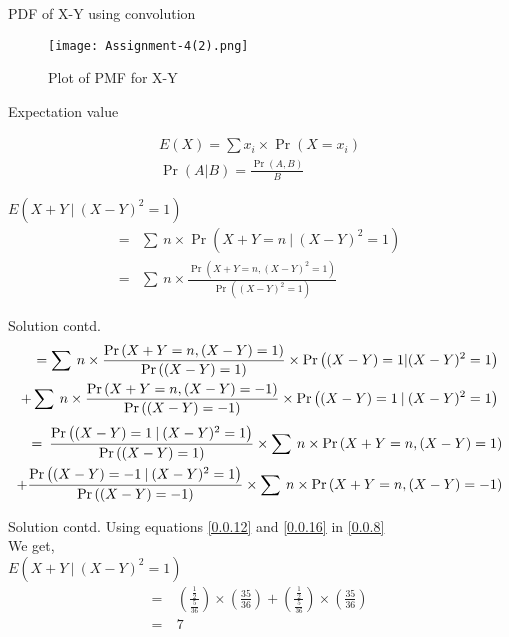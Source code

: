 \documentclass{beamer}
\providecommand{\brak}[1]{\ensuremath{\left(#1\right)}}
\begin{document}
\begin{frame}{PDF of X-Y using convolution}
    \begin{figure}[htb]
        \texttt{[image: Assignment-4(2).png]}
        \caption{Plot of PMF for X-Y}
    \end{figure}
\end{frame}

\begin{frame}{Expectation value}
    \begin{block}
        \begin{align}
            E\brak{X}=\sum x_{i}\times\Pr\brak{X=x_{i}}\\
            \Pr\brak{A|B}=\frac{\Pr\brak{A,B}}{B}
        \end{align}
    \end{block}
    \begin{block}
        $E\brak{X+Y\:|\:(X-Y)^2=1}$
        \begin{align}
            =&\sum\:n\times\Pr\brak{X+Y=n\:|\:(X-Y)^2=1}\\
            =&\sum\:n\times\frac{\Pr\brak{X+Y=n,(X-Y)^2=1}}{\Pr\brak{(X-Y)^2=1}}
        \end{align}
    \end{block}
\end{frame}

\begin{frame}{Solution contd.}
    \begin{align}
        \begin{split}
            =\sum\:n\times\frac{\Pr\brak{X+Y=n,(X-Y)=1}}{\Pr\brak{(X-Y)=1}}\times\Pr\brak{(X-Y)=1|(X-Y)^2=1}
            \bigskip\\
            +\sum\:n\times\frac{\Pr\brak{X+Y=n,(X-Y)=-1}}{\Pr\brak{(X-Y)=-1}}\times\Pr\brak{(X-Y)=1\:|\:(X-Y)^2=1}
        \end{split}
    \end{align}
    \begin{align}
        \begin{split}
            =\:\frac{\Pr\brak{(X-Y)=1\:|\:(X-Y)^2=1}}{\Pr\brak{(X-Y)=1}}
            \times\sum\:n\times\Pr\brak{X+Y=n,(X-Y)=1}
            \bigskip\\
            +\frac{\Pr\brak{(X-Y)=-1\:|\:(X-Y)^2=1}}{\Pr\brak{(X-Y)=-1}}
            \times\sum\:n\times\Pr\brak{X+Y=n,(X-Y)=-1}\label{0.0.8}
        \end{split}
    \end{align}
\end{frame}

\begin{frame}{Solution contd.}
    Using equations \eqref{0.0.12} and \eqref{0.0.16} in \eqref{0.0.8}\\
    We get,\\
    \newline
    $E\brak{X+Y\:|\:(X-Y)^2=1}$
    \begin{align}
        =&\:\brak{\frac{\frac{1}{2}}{\frac{5}{36}}}\times\brak{\frac{35}{36}}+\brak{\frac{\frac{1}{2}}{\frac{5}{36}}}\times\brak{\frac{35}{36}}\\
        =&\:7
    \end{align}
\end{frame}
\end{document}

